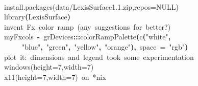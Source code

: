 \documentclass[a4paper]{article}
\newcommand{\hlfunctioncall}[1]{\textcolor[rgb]{1,0,0}{#1}}%
\newcommand{\hlstring}[1]{\textcolor[rgb]{0.6,0.6,1}{#1}}%
\newcommand{\hlkeyword}[1]{\textcolor[rgb]{0,0,0}{\textbf{#1}}}%
\newcommand{\hlargument}[1]{\textcolor[rgb]{0.694117647058824,0.247058823529412,0.0196078431372549}{#1}}%
\newcommand{\hlcomment}[1]{\textcolor[rgb]{0.8,0.8,0.8}{#1}}%
\newcommand{\hlassignement}[1]{\textcolor[rgb]{0.215686274509804,0.215686274509804,0.384313725490196}{\textbf{#1}}}%
\newcommand{\hlpackage}[1]{\textcolor[rgb]{0.588235294117647,0.713725490196078,0.145098039215686}{#1}}%
\newcommand{\hlsymbol}[1]{\textcolor[rgb]{0,0,0}{#1}}%
\newcommand{\hlprompt}[1]{\textcolor[rgb]{0,0,0}{#1}}%
\newcommand{\hlstd}[1]{\textcolor[rgb]{0,0,0}{#1}}%
\newenvironment{Houtput}{\raggedright}{%
%
}
\begin{document}
\begin{Houtput}
\hspace*{\fill}\\
\hlstd{}\ttfamily\noindent
\hlprompt{\usebox{\hlnormalsizeboxgreaterthan}{\ }}\hlcomment{\usebox{\hlnormalsizeboxhash}install.packages(\usebox{\hlnormalsizeboxsinglequote}data/LexisSurface\usebox{\hlnormalsizeboxunderscore}1.1.zip\usebox{\hlnormalsizeboxsinglequote},repos=NULL)}\mbox{}
\normalfont
\hspace*{\fill}\\
\hlstd{}\ttfamily\noindent
\hlprompt{\usebox{\hlnormalsizeboxgreaterthan}{\ }}\hlfunctioncall{library}\hlkeyword{(}\hlsymbol{LexisSurface}\hlkeyword{)}\mbox{}
\normalfont
\hspace*{\fill}\\
\hlstd{}\ttfamily\noindent
\hlprompt{\usebox{\hlnormalsizeboxgreaterthan}{\ }}\hlcomment{\usebox{\hlnormalsizeboxhash}{\ }invent{\ }Fx{\ }color{\ }ramp{\ }(any{\ }suggestions{\ }for{\ }better?)}\mbox{}
\normalfont
\hspace*{\fill}\\
\hlstd{}\ttfamily\noindent
\hlprompt{\usebox{\hlnormalsizeboxgreaterthan}{\ }}\hlsymbol{myFxcols}{\ }\hlassignement{\usebox{\hlnormalsizeboxlessthan}-}{\ }\hlpackage{grDevices}\hlkeyword{:::}\hlfunctioncall{colorRampPalette}\hlkeyword{(}\hlfunctioncall{c}\hlkeyword{(}\hlstring{"white"}\hlkeyword{,}\hspace*{\fill}\\
\hlstd{}\hlprompt{{\ }}{\ }{\ }{\ }{\ }\hlstring{"blue"}\hlkeyword{,}{\ }\hlstring{"green"}\hlkeyword{,}{\ }\hlstring{"yellow"}\hlkeyword{,}{\ }\hlstring{"orange"}\hlkeyword{)}\hlkeyword{,}{\ }\hlargument{space}{\ }\hlargument{=}{\ }\hlstring{"rgb"}\hlkeyword{)}\mbox{}
\normalfont
\hspace*{\fill}\\
\hlstd{}\ttfamily\noindent
\hlprompt{\usebox{\hlnormalsizeboxgreaterthan}{\ }}\hlcomment{\usebox{\hlnormalsizeboxhash}{\ }plot{\ }it:{\ }dimensions{\ }and{\ }legend{\ }took{\ }some{\ }experimentation}\mbox{}
\normalfont
\hspace*{\fill}\\
\hlstd{}\ttfamily\noindent
\hlprompt{\usebox{\hlnormalsizeboxgreaterthan}{\ }}\hlcomment{\usebox{\hlnormalsizeboxhash}windows(height=7,width=7)}\mbox{}
\normalfont
\hspace*{\fill}\\
\hlstd{}\ttfamily\noindent
\hlprompt{\usebox{\hlnormalsizeboxgreaterthan}{\ }}\hlcomment{\usebox{\hlnormalsizeboxhash}x11(height=7,width=7){\ }on{\ }*nix}\mbox{}

\end{Houtput}
\end{document}
